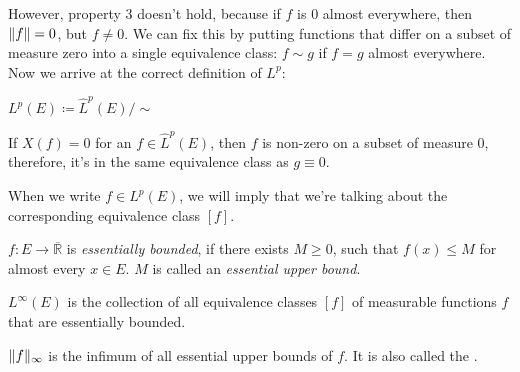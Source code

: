 However, property 3 doesn't hold, because if $f$ is 0 almost everywhere,
then $\lVert f\rVert = 0$, but $f \ne 0$. We can fix this by putting functions that
differ on a subset of measure zero
into a single equivalence class:
$f \sim g$ if $f = g$ almost everywhere.
Now we arrive at the correct definition of $L^p$:
\begin{definition}
    $L^p(E) \coloneqq \hat{L}^p(E) / {\sim }$
\end{definition}
\begin{remark}
    If $X(f) = 0$ for an $f \in \hat{L}^p(E)$,
    then $f$ is non-zero on a subset of measure 0, therefore, it's
    in the same equivalence class as $g \equiv 0$.
\end{remark}
\begin{remark}
    When we write $f \in L^p(E)$, we will imply that we're talking about the corresponding
    equivalence class $[f]$.
\end{remark}

\begin{definition}
    $f : E \to \overline{\mathbb{R}}$ is \textit{essentially bounded}, if
    there exists $M \ge 0$, such that
    $f(x) \le M$ for almost every $x \in E$. $M$ is called an \textit{essential upper bound}.
\end{definition}
\begin{definition}
    $L^\infty(E)$ is the collection of all equivalence classes $[f]$ of 
    measurable functions $f$ that are essentially bounded.

    $\lVert f\rVert_\infty$ is the infimum of all essential upper bounds of $f$.
    It is also called the . 
\end{definition}
